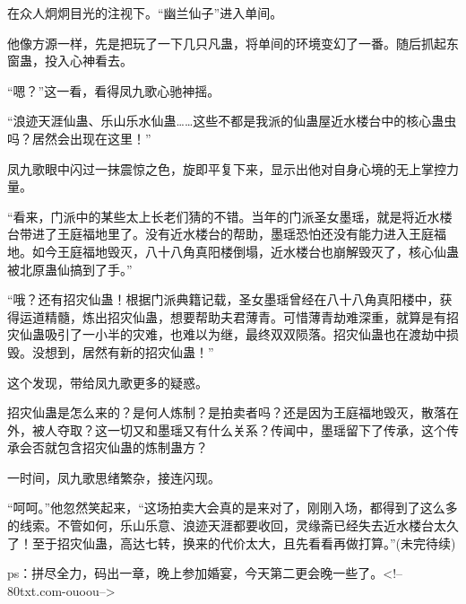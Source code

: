 \begin{this_body}
在众人炯炯目光的注视下。“幽兰仙子”进入单间。

他像方源一样，先是把玩了一下几只凡蛊，将单间的环境变幻了一番。随后抓起东窗蛊，投入心神看去。

“嗯？”这一看，看得凤九歌心驰神摇。

“浪迹天涯仙蛊、乐山乐水仙蛊……这些不都是我派的仙蛊屋近水楼台中的核心蛊虫吗？居然会出现在这里！”

凤九歌眼中闪过一抹震惊之色，旋即平复下来，显示出他对自身心境的无上掌控力量。

“看来，门派中的某些太上长老们猜的不错。当年的门派圣女墨瑶，就是将近水楼台带进了王庭福地里了。没有近水楼台的帮助，墨瑶恐怕还没有能力进入王庭福地。如今王庭福地毁灭，八十八角真阳楼倒塌，近水楼台也崩解毁灭了，核心仙蛊被北原蛊仙搞到了手。”

“哦？还有招灾仙蛊！根据门派典籍记载，圣女墨瑶曾经在八十八角真阳楼中，获得运道精髓，炼出招灾仙蛊，想要帮助夫君薄青。可惜薄青劫难深重，就算是有招灾仙蛊吸引了一小半的灾难，也难以为继，最终双双陨落。招灾仙蛊也在渡劫中损毁。没想到，居然有新的招灾仙蛊！”

这个发现，带给凤九歌更多的疑惑。

招灾仙蛊是怎么来的？是何人炼制？是拍卖者吗？还是因为王庭福地毁灭，散落在外，被人夺取？这一切又和墨瑶又有什么关系？传闻中，墨瑶留下了传承，这个传承会否就包含招灾仙蛊的炼制蛊方？

一时间，凤九歌思绪繁杂，接连闪现。

“呵呵。”他忽然笑起来，“这场拍卖大会真的是来对了，刚刚入场，都得到了这么多的线索。不管如何，乐山乐意、浪迹天涯都要收回，灵缘斋已经失去近水楼台太久了！至于招灾仙蛊，高达七转，换来的代价太大，且先看看再做打算。”(未完待续)

ps：拼尽全力，码出一章，晚上参加婚宴，今天第二更会晚一些了。<!--80txt.com-ouoou-->

\end{this_body}

